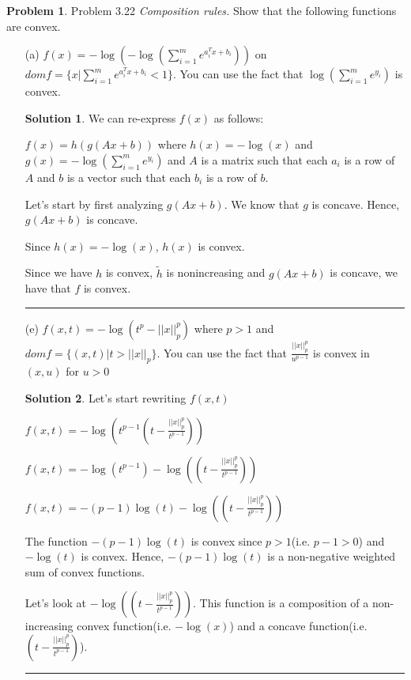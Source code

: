 \documentclass{article}
\theoremstyle{definition}
\newtheorem{problem}{Problem}
\def\fline{\rule{0.75\linewidth}{0.5pt}}
\newcommand{\finishline}{\begin{center}\fline\end{center}}
\newtheorem*{solution*}{Solution}
\newenvironment{solution}{\begin{solution*}}{{\finishline} \end{solution*}}
\begin{document}
\begin{problem} Problem 3.22
\textit{Composition rules.} Show that the following functions are convex.

\begin{itemize}
    \item[(a)] $f(x) = -\log(-\log(\sum_{i=1}^{m} e^{a_i^Tx + b_i}))$ on $dom f = \{ x | \sum_{i=1}^{m} e^{a_i^Tx + b_i} < 1\}$. You can use the fact that $\log(\sum_{i=1}^{m} e^{y_i})$ is convex. 

    \begin{solution}
        We can re-express $f(x)$ as follows: \newline 

        $f(x) = h(g(Ax + b))$ where $h(x) = - \log(x)$ and $g(x) = -\log(\sum_{i=1}^{m} e^{y_i})$ and $A$ is a matrix such that each $a_i$ is a row of $A$ and $b$ is a vector such that each $b_i$ is a row of $b$. 

        Let's start by first analyzing $g(Ax + b)$. We know that $g$ is concave. Hence, $g(Ax + b)$ is concave. 

        Since $h(x) = - \log(x)$, $h(x)$ is convex. 

        Since we have $h$ is convex, $\tilde{h}$ is nonincreasing and $g(Ax + b)$ is concave, we have that $f$ is convex. 
    \end{solution}

    \item[(e)] $f(x, t) = -\log(t^p - ||x||^p_p)$ where $p > 1$ and $dom f = \{(x, t) | t > ||x||_p \}$. You can use the fact that $\frac{||x||^p_p}{u^{p - 1}}$ is convex in $(x, u)$ for $u > 0$

    \begin{solution}
        Let's start rewriting $f(x, t)$ \newline 

        $f(x, t) = -\log(t^{p - 1}(t - \frac{||x||^p_p}{t^{p - 1}}))$ \newline 

        $f(x, t) = -\log(t^{p - 1}) - \log((t - \frac{||x||^p_p}{t^{p - 1}}))$

        $f(x, t) = -(p - 1)\log(t) - \log((t - \frac{||x||^p_p}{t^{p - 1}}))$

        The function $-(p - 1)\log(t)$ is convex since $p > 1$(i.e. $p - 1 > 0$) and $-\log(t)$ is convex. Hence, $-(p - 1)\log(t)$ is a non-negative weighted sum of convex functions. \newline 

        Let's look at $- \log((t - \frac{||x||^p_p}{t^{p - 1}}))$. This function is a composition of a non-increasing convex function(i.e. $-\log(x)$) and a concave function(i.e. $(t - \frac{||x||^p_p}{t^{p - 1}})$). 


\end{solution}
\end{itemize}
\end{problem}
\end{document}
